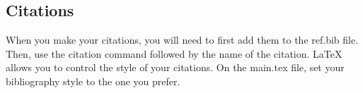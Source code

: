 \subsection{Citations}
When you make your citations, you will need to first add them to the ref.bib file. Then, use the citation command followed by the name of the citation.\cite{Example:1} LaTeX allows you to control the style of your citations.\cite{Example:2} On the main.tex file, set your bibliography style to the one you prefer. 



